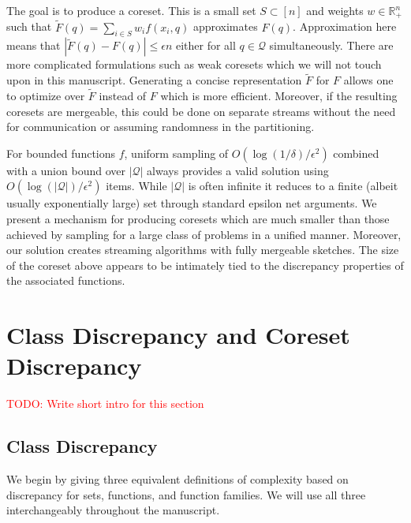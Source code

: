 \documentclass[anon,12pt]{colt2019} %
\newcommand{\todo}[1]{\textcolor{red}{TODO: #1}}
\newcommand{\R}{\mathbb{R}}
\newcommand{\eps}{\epsilon}
\begin{document}
The goal is to produce a coreset. This is a small set $S\subset [n]$ and weights $w \in\R_+^{n}$ such that $\tilde F(q) = \sum_{i \in S} w_i f(x_i,q)$ approximates $F(q)$.
Approximation here means that $|\tilde F(q)  - F(q)| \le \eps n$ either for all $q \in \mathcal Q$ simultaneously. %
There are more complicated formulations such as weak coresets which we will not touch upon in this manuscript. 
Generating a concise representation $\tilde F$ for $F$ allows one to optimize over $\tilde F$ instead of $F$ which is more efficient. 
Moreover, if the resulting coresets are mergeable, this could be done on separate streams without the need for communication or assuming randomness in the partitioning.

For bounded functions $f$, uniform sampling of $O(\log(1/\delta)/\eps^2)$ combined with a union bound over $|\mathcal Q|$ always provides a valid solution using $O(\log(|\mathcal Q|)/\eps^2)$ items. 
While $|\mathcal Q|$ is often infinite it reduces to a finite (albeit usually exponentially large) set through standard epsilon net arguments. 
%
We present a mechanism for producing coresets which are much smaller than those achieved by sampling for a large class of problems in a unified manner.  
Moreover, our solution creates streaming algorithms with fully mergeable sketches. 
The size of the coreset above appears to be intimately tied to the discrepancy properties of the associated functions.


\section{Class Discrepancy and Coreset Discrepancy}

\todo{Write short intro for this section}
\subsection{Class Discrepancy}
We begin by giving three equivalent definitions of complexity based on discrepancy for sets, functions, and function families. We will use all three interchangeably throughout the manuscript.
\end{document}
